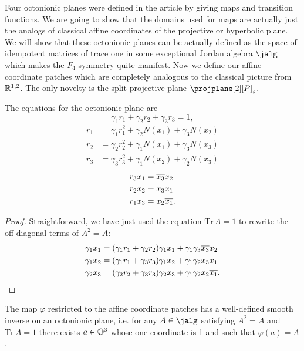 Four octonionic planes were defined in the article \cite{held_semi-riemannian_2009} by giving maps and transition functions. We are going to show that the domains used for maps are actually just the analogs of classical affine coordinates of the projective or hyperbolic plane. We will show that these octonionic planes can be actually defined as the space of idempotent matrices of trace one in some exceptional Jordan algebra $\jalg$ which makes the $F_4$-symmetry quite manifest. Now we define our affine coordinate patches which are completely analogous to the classical picture from $\mathbb{R}^{1,2}$. The only novelty is the split projective plane $\projplane[2][P]_s$.


\begin{lemma}
 The equations for the octonionic plane are 
\begin{equation}\label{eq:trace}
\gamma_1 r_1 + \gamma_2 r_2 + \gamma_3 r_3 = 1,
\end{equation}
\begin{align}
 r_1 & = \gamma_1 r_1^2 + \gamma_2 N(x_1) + \gamma_3 N(x_2) \label{eq:diag1}\\
 r_2 & = \gamma_2 r_2^2 + \gamma_1 N(x_1) + \gamma_3 N(x_3) \label{eq:diag2} \\
 r_3 & = \gamma_3 r_3^2 + \gamma_1 N(x_2) + \gamma_2 N(x_3) \label{eq:diag3}
\end{align}
\begin{align}
 r_3 x_1 &= \overline{x_3}x_2 \label{eq:antidiag1} \\
 r_2 x_2 &= x_3 x_1 \label{eq:antidiag2} \\
 r_1 x_3 &= x_2\overline{x_1}.  \label{eq:antidiag3}
\end{align}
\end{lemma}
\begin{proof}
Straightforward, we have just used the equation $\mathrm{Tr}\, A = 1$ to rewrite the off-diagonal terms of $A^2=A$:
\begin{align*}
\gamma_1 x_1 &= (\gamma_1 r_1 + \gamma_2 r_2)\gamma_1 x_1  + \gamma_1\gamma_3 \overline{x_3}x_2 \\
\gamma_1 x_2 &= (\gamma_1 r_1 + \gamma_3 r_3)\gamma_1 x_2  + \gamma_1\gamma_2 x_3 x_1 \\
\gamma_2 x_3 &= (\gamma_2 r_2 + \gamma_3 r_3)\gamma_2 x_3  + \gamma_1\gamma_2 x_2\overline{x_1}.
\end{align*}


\end{proof}
\begin{lemma}
The map $\varphi$ restricted to the affine coordinate patches has a well-defined smooth inverse on an octonionic plane, i.e. for any $A \in \jalg$ satisfying $A^2 = A$ and $\mathrm{Tr}\, A = 1$ there exists $a\in \mathbb{O}^3$ whose one coordinate is 1 and such that $\varphi(a) = A$.
\end{lemma}
